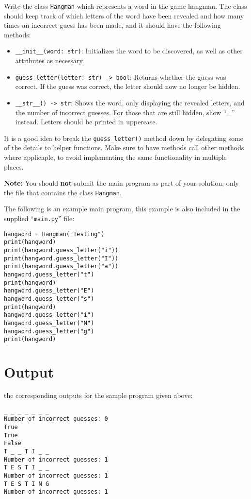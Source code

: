 
Write the class \texttt{Hangman} which represents a word in the game hangman.
The class should keep track of which letters of the word have been revealed and how many times an incorrect guess has been made,
and it should have the following methods:
\begin{itemize}
    \item \texttt{\_\_init\_\_(word: str)}: Initializes the word to be discovered, as well as other attributes as necessary.
    \item \texttt{guess\_letter(letter: str) -> bool}: Returns whether the guess was correct.
        If the guess was correct, the letter should now no longer be hidden.
    \item \texttt{\_\_str\_\_() -> str}: Shows the word, only displaying the revealed letters, and the number of incorrect guesses. 
        For those that are still hidden, show ``\_'' instead. Letters should be printed in uppercase.
\end{itemize}

It is a good idea to break the \texttt{guess\_letter()} method down by delegating some of the details to helper functions.
Make sure to have methods call other methods where applicaple, to avoid implementing the same functionality in multiple places.

\textbf{Note:} You should \textbf{not} submit the main program as part of your solution, only the file that contains the class \texttt{Hangman}.

The following is an example main program, this example is also included in the supplied ``\texttt{main.py}'' file:
\begin{verbatim}
hangword = Hangman("Testing")
print(hangword)
print(hangword.guess_letter("i"))
print(hangword.guess_letter("I"))
print(hangword.guess_letter("a"))
hangword.guess_letter("t")
print(hangword)
hangword.guess_letter("E")
hangword.guess_letter("s")
print(hangword)
hangword.guess_letter("i")
hangword.guess_letter("N")
hangword.guess_letter("g")
print(hangword)
\end{verbatim}

\section*{Output}
the corresponding outputs for the sample program given above:

\begin{verbatim}
_ _ _ _ _ _ _
Number of incorrect guesses: 0
True
True
False
T _ _ T I _ _
Number of incorrect guesses: 1
T E S T I _ _
Number of incorrect guesses: 1
T E S T I N G
Number of incorrect guesses: 1
\end{verbatim}
